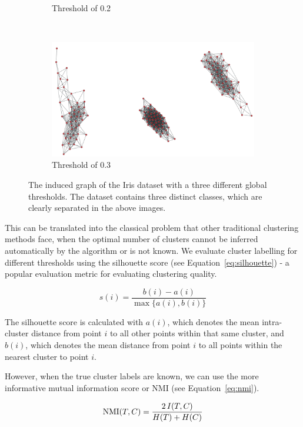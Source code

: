 \documentclass[conference]{IEEEtran}
\begin{document}
\begin{figure}[H]
\begin{subfigure}[c]{\columnwidth}
        \caption{Threshold of 0.2}
        \label{fig:iris_graph2}
    \end{subfigure}
    ~
    \begin{subfigure}[c]{\columnwidth}
        \includegraphics[width=\columnwidth]{images/iris_threshold_03.png}
        \caption{Threshold of 0.3}
        \label{fig:iris_graph3}
    \end{subfigure}
    \caption{The induced graph of the Iris dataset with a three different global thresholds. The dataset contains three distinct classes, which are clearly separated in the above images.}\label{fig:iris_graph}
\end{figure}

This can be translated into the classical problem that other traditional clustering methods face, when the optimal number of clusters cannot be inferred automatically by the algorithm or is not known. We evaluate cluster labelling for different thresholds using the silhouette score (see Equation~\ref{eq:silhouette}) - a popular evaluation metric for evaluating clustering quality.

\begin{equation}\label{eq:silhouette}
s(i) = \frac{{b(i) - a(i)}}{\max\{a(i),b(i)\}}
\end{equation}

The silhouette score is calculated with $a(i)$, which denotes the mean intra-cluster distance from point $i$ to all other points within that same cluster, and $b(i)$, which denotes the mean distance from point $i$ to all points within the nearest cluster to point $i$.

However, when the true cluster labels are known, we can use the more informative mutual information score or NMI (see Equation~\ref{eq:nmi}).

\begin{equation}\label{eq:nmi}
\textnormal{NMI}(T, C) = \frac{2 \, I(T, C)}{H(T) + H(C)}
\end{equation}
\end{document}
